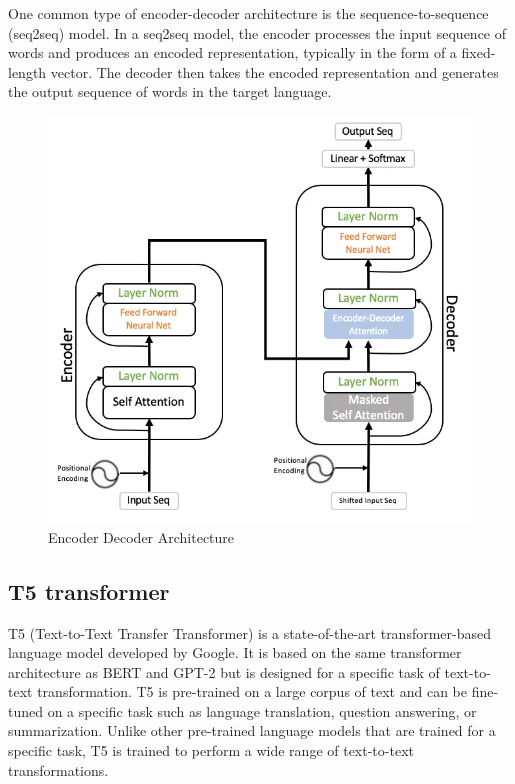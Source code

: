 \documentclass[12pt]{report}
\begin{document}
One common type of encoder-decoder architecture is the sequence-to-sequence (seq2seq) model. In a seq2seq model, the encoder processes the input sequence of words and produces an encoded representation, typically in the form of a fixed-length vector. The decoder then takes the encoded representation and generates the output sequence of words in the target language.
\begin{figure}[ht!]
    \centering
    \includegraphics[scale = 0.5]{Images/Encoder_Decoder.png}
    \caption{Encoder Decoder Architecture}
    \label{fig:Encoder Decoder Architecture}
\end{figure}


 \subsection{T5 transformer}
T5\cite{t5} (Text-to-Text Transfer Transformer) is a state-of-the-art transformer-based language model developed by Google. It is based on the same transformer architecture as BERT and GPT-2 but is designed for a specific task of text-to-text transformation. T5 is pre-trained on a large corpus of text and can be fine-tuned on a specific task such as language translation, question answering, or summarization. Unlike other pre-trained language models that are trained for a specific task, T5 is trained to perform a wide range of text-to-text transformations.
\end{document}
